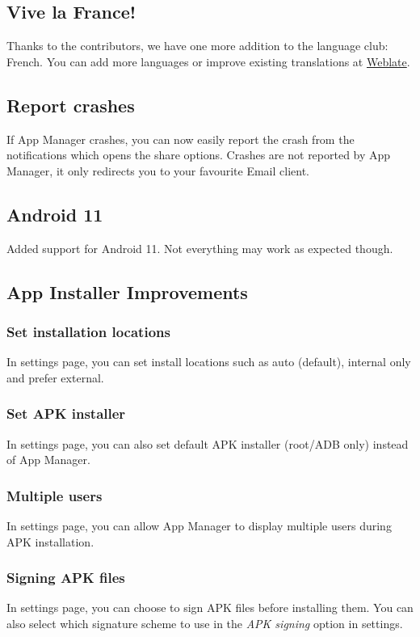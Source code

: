\subsection{Vive la France!}
Thanks to the contributors, we have one more addition to the language club: French. You can add more languages or
improve existing translations at \href{https://hosted.weblate.org/engage/app-manager}{Weblate}.

\subsection{Report crashes}
If App Manager crashes, you can now easily report the crash from the notifications which opens the share options.
Crashes are not reported by App Manager, it only redirects you to your favourite Email client.

\subsection{Android 11}
Added support for Android 11. Not everything may work as expected though.

\subsection{App Installer Improvements}

\subsubsection{Set installation locations}
In settings page, you can set install locations such as auto (default), internal only and prefer external.

\subsubsection{Set APK installer}
In settings page, you can also set default APK installer (root/ADB only) instead of App Manager.

\subsubsection{Multiple users}
In settings page, you can allow App Manager to display multiple users during APK installation.

\subsubsection{Signing APK files}
In settings page, you can choose to sign APK files before installing them. You can also select which signature scheme
to use in the \textit{APK signing} option in settings.


